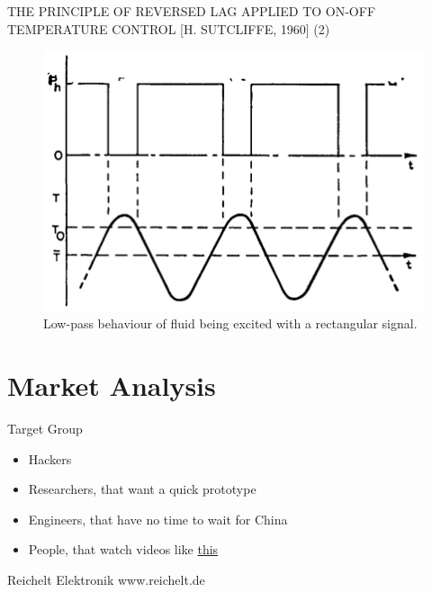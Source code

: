 \documentclass[apectratio=169]{beamer}
\begin{document}
\begin{frame}{THE PRINCIPLE OF REVERSED LAG APPLIED TO ON-OFF TEMPERATURE
CONTROL [H. SUTCLIFFE, 1960] (2)}
  \begin{figure}
    \centering
    \includegraphics[scale = 0.4]{./fig/paper22}
    \caption{Low-pass behaviour of fluid being excited with a rectangular signal.}
  \end{figure}	
\end{frame}

\section{Market Analysis}

\begin{frame}{Target Group}
  \begin{itemize}
    \item<1-> Hackers
    \item<2-> Researchers, that want a quick prototype
    \item<3-> Engineers, that have no time to wait for China
    \item<4-> People, that watch videos like \href{https://www.youtube.com/watch?v=Hsw3lOnHaas}{this}

  \end{itemize}
 \end{frame}

\begin{frame}{Reichelt Elektronik}
  \centering
  \Huge www.reichelt.de
\end{frame}
\end{document}
